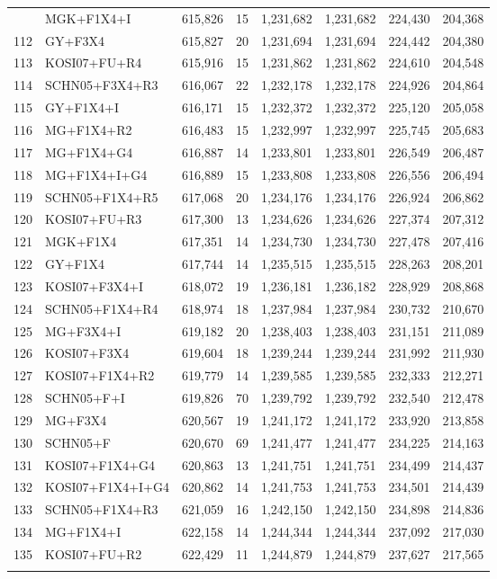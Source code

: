 \begin{longtable}{rlrrrrrr}
{111&MGK+F1X4+I&615,826&15&1,231,682&1,231,682&224,430&204,368\\
112&GY+F3X4&615,827&20&1,231,694&1,231,694&224,442&204,380\\
113&KOSI07+FU+R4&615,916&15&1,231,862&1,231,862&224,610&204,548\\
114&SCHN05+F3X4+R3&616,067&22&1,232,178&1,232,178&224,926&204,864\\
115&GY+F1X4+I&616,171&15&1,232,372&1,232,372&225,120&205,058\\
116&MG+F1X4+R2&616,483&15&1,232,997&1,232,997&225,745&205,683\\
117&MG+F1X4+G4&616,887&14&1,233,801&1,233,801&226,549&206,487\\
118&MG+F1X4+I+G4&616,889&15&1,233,808&1,233,808&226,556&206,494\\
119&SCHN05+F1X4+R5&617,068&20&1,234,176&1,234,176&226,924&206,862\\
120&KOSI07+FU+R3&617,300&13&1,234,626&1,234,626&227,374&207,312\\
121&MGK+F1X4&617,351&14&1,234,730&1,234,730&227,478&207,416\\
122&GY+F1X4&617,744&14&1,235,515&1,235,515&228,263&208,201\\
123&KOSI07+F3X4+I&618,072&19&1,236,181&1,236,182&228,929&208,868\\
124&SCHN05+F1X4+R4&618,974&18&1,237,984&1,237,984&230,732&210,670\\
125&MG+F3X4+I&619,182&20&1,238,403&1,238,403&231,151&211,089\\
126&KOSI07+F3X4&619,604&18&1,239,244&1,239,244&231,992&211,930\\
127&KOSI07+F1X4+R2&619,779&14&1,239,585&1,239,585&232,333&212,271\\
128&SCHN05+F+I&619,826&70&1,239,792&1,239,792&232,540&212,478\\
129&MG+F3X4&620,567&19&1,241,172&1,241,172&233,920&213,858\\
130&SCHN05+F&620,670&69&1,241,477&1,241,477&234,225&214,163\\
131&KOSI07+F1X4+G4&620,863&13&1,241,751&1,241,751&234,499&214,437\\
132&KOSI07+F1X4+I+G4&620,862&14&1,241,753&1,241,753&234,501&214,439\\
133&SCHN05+F1X4+R3&621,059&16&1,242,150&1,242,150&234,898&214,836\\
134&MG+F1X4+I&622,158&14&1,244,344&1,244,344&237,092&217,030\\
135&KOSI07+FU+R2&622,429&11&1,244,879&1,244,879&237,627&217,565\\
}
\end{longtable}
